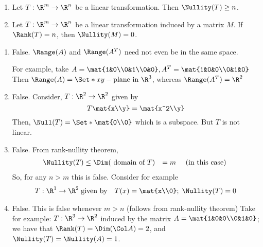 \begin{exercises}
\begin{problist}
\begin{enumerate}
			\item Let $T:\R^{m}\to\R^{n}$ be a linear transformation. Then $\Nullity(T)
				\geq n$.

			\item Let $T:\R^{m}\to\R^{n}$ be a linear transformation induced by
				a matrix $M$. If $\Rank(T) = n$, then $\Nullity(M) = 0$.
		\end{enumerate}


		\begin{solution}

			\begin{enumerate}
				\item False. $\Range(A)$ and $\Range(A^{T})$ need not even
					be in the same space.

					For example, take $A=\mat{1&0\\0&1\\0&0}, A^{T}=\mat{1&0&0\\0&1&0}$
					Then $\Range(A)=\Set*{xy-\text{plane in }\R^3}$,
					whereas $\Range(A^{T})=\R^{2}$

				\item False. Consider, $T:\R^{2}\to\R^{2}$ given by
					\[
						T\mat{x\\y}=\mat{x^2\\y}
					\]
					 Then, $\Null(T)= \Set*{\mat{0\\0}}$ which is a subspace.
					But $T$ is not linear.

				\item False. From rank-nullity theorem,
					\begin{align*}
						\Nullity(T) & \leq \Dim(\text{ domain of }T) & =m \quad \text{ (in this case) }
					\end{align*}So, for any $n>m$ this is false. Consider
					for example
					\begin{align*}
						 & T:\R^{1}\to\R^{2}\;\text{given by} & T(x)=\mat{x\\0};\; \Nullity(T)=0
					\end{align*}

				\item False. This is false whenever $m>n$ (follows from rank-nullity
					theorem) Take for example: $T:\R^{3}\to\R^{2}$ induced
					by the matrix $A=\mat{1&0&0\\0&1&0}$;\\ we have that $\Rank(T)=\Dim(\Col
					A)=2$, and $\Nullity(T) = \Nullity(A)=1$.
			\end{enumerate}
		\end{solution}


\end{problist}
\end{exercises}
